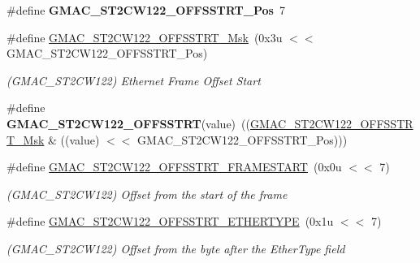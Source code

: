 \begin{DoxyCompactItemize}
\item 
\mbox{\label{group__SAMV71__GMAC_ga0848e190ec3fc1295158dbd217b77556}} 
\#define {\bfseries G\+M\+A\+C\+\_\+\+S\+T2\+C\+W122\+\_\+\+O\+F\+F\+S\+S\+T\+R\+T\+\_\+\+Pos}~7
\item 
\mbox{\label{group__SAMV71__GMAC_gac0a49370152e2eee31b4444643002e12}} 
\#define \mbox{\hyperlink{group__SAMV71__GMAC_gac0a49370152e2eee31b4444643002e12}{G\+M\+A\+C\+\_\+\+S\+T2\+C\+W122\+\_\+\+O\+F\+F\+S\+S\+T\+R\+T\+\_\+\+Msk}}~(0x3u $<$$<$ G\+M\+A\+C\+\_\+\+S\+T2\+C\+W122\+\_\+\+O\+F\+F\+S\+S\+T\+R\+T\+\_\+\+Pos)
\begin{DoxyCompactList}\small\item\em (G\+M\+A\+C\+\_\+\+S\+T2\+C\+W122) Ethernet Frame Offset Start \end{DoxyCompactList}\item 
\mbox{\label{group__SAMV71__GMAC_ga1207404e34facbd078e73bf7d094eaab}} 
\#define {\bfseries G\+M\+A\+C\+\_\+\+S\+T2\+C\+W122\+\_\+\+O\+F\+F\+S\+S\+T\+RT}(value)~((\mbox{\hyperlink{group__SAMV71__GMAC_gac0a49370152e2eee31b4444643002e12}{G\+M\+A\+C\+\_\+\+S\+T2\+C\+W122\+\_\+\+O\+F\+F\+S\+S\+T\+R\+T\+\_\+\+Msk}} \& ((value) $<$$<$ G\+M\+A\+C\+\_\+\+S\+T2\+C\+W122\+\_\+\+O\+F\+F\+S\+S\+T\+R\+T\+\_\+\+Pos)))
\item 
\mbox{\label{group__SAMV71__GMAC_gaa2759a23ab3233270061854d197d088d}} 
\#define \mbox{\hyperlink{group__SAMV71__GMAC_gaa2759a23ab3233270061854d197d088d}{G\+M\+A\+C\+\_\+\+S\+T2\+C\+W122\+\_\+\+O\+F\+F\+S\+S\+T\+R\+T\+\_\+\+F\+R\+A\+M\+E\+S\+T\+A\+RT}}~(0x0u $<$$<$ 7)
\begin{DoxyCompactList}\small\item\em (G\+M\+A\+C\+\_\+\+S\+T2\+C\+W122) Offset from the start of the frame \end{DoxyCompactList}\item 
\mbox{\label{group__SAMV71__GMAC_ga8b058df32dc9de84a9ab2423cc98160a}} 
\#define \mbox{\hyperlink{group__SAMV71__GMAC_ga8b058df32dc9de84a9ab2423cc98160a}{G\+M\+A\+C\+\_\+\+S\+T2\+C\+W122\+\_\+\+O\+F\+F\+S\+S\+T\+R\+T\+\_\+\+E\+T\+H\+E\+R\+T\+Y\+PE}}~(0x1u $<$$<$ 7)
\begin{DoxyCompactList}\small\item\em (G\+M\+A\+C\+\_\+\+S\+T2\+C\+W122) Offset from the byte after the Ether\+Type field \end{DoxyCompactList}\item 

\end{DoxyCompactItemize}
